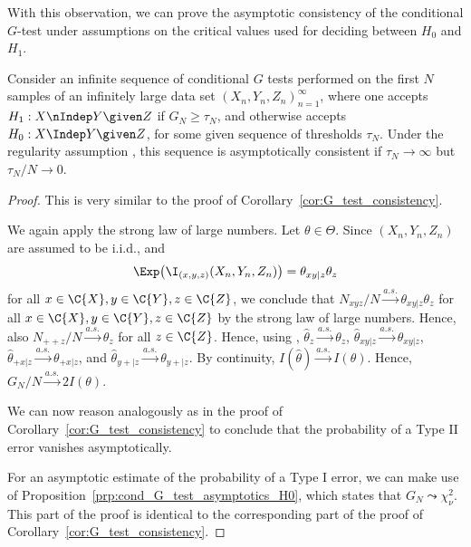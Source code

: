 With this observation, we can prove the asymptotic consistency of the conditional $G$-test under assumptions on the critical values used
for deciding between $H_0$ and $H_1$.
\begin{Cor}\label{cor:cond_G_test_consistency}
Consider an infinite sequence of conditional $G$ tests performed on the first $N$ samples of an infinitely large
data set $(X_n,Y_n,Z_n)_{n=1}^\infty$,
where one accepts $H_1 : X \nIndep Y \given Z$ if $G_N \ge \tau_N$, and otherwise accepts $H_0 : X \Indep Y \given Z$, 
for some given sequence of thresholds $\tau_N$.
Under the regularity assumption , this sequence is
asymptotically consistent if $\tau_N \to \infty$ but $\tau_N / N \to 0$.
\end{Cor}
\begin{proof}
This is very similar to the proof of Corollary~\ref{cor:G_test_consistency}.
  
We again apply the strong law of large numbers.
Let $\theta \in \Theta$. Since $(X_n,Y_n,Z_n)$ are assumed to be i.i.d., and 
  $$\Exp \big(\I_{(x,y,z)}(X_n,Y_n,Z_n)\big) = \theta_{xy|z}\theta_z$$
for all $x \in \C{X}, y \in \C{Y}, z \in \C{Z}$,
we conclude that $N_{xyz} / N \stackrel{a.s.}{\to} \theta_{xy|z} \theta_z$ for all $x \in \C{X}, y \in \C{Y}, z\in \C{Z}$
by the strong law of large numbers. Hence, also $N_{+ + z} / N \stackrel{a.s.}{\to} \theta_z$ for all $z \in \C{Z}$.
Hence, using ,
$\hat\theta_z \stackrel{a.s.}{\to} \theta_z$,
$\hat\theta_{xy|z} \stackrel{a.s.}{\to} \theta_{xy|z}$,
$\hat\theta_{+ x|z} \stackrel{a.s.}{\to} \theta_{+ x|z}$, and
$\hat\theta_{y +|z} \stackrel{a.s.}{\to} \theta_{y +|z}$.
By continuity, $I(\hat\theta) \stackrel{a.s.}{\to} I(\theta)$.
Hence, $G_N / N \stackrel{a.s.}{\to} 2I(\theta)$. 
  
We can now reason analogously as in the proof of 
Corollary~\ref{cor:G_test_consistency} to conclude that
the probability of a Type II error vanishes asymptotically.

For an asymptotic estimate of the probability of a Type I error,
we can make use of Proposition~\ref{prp:cond_G_test_asymptotics_H0},
which states that $G_N \leadsto \chi_{\nu}^2$. 
This part of the proof is identical to the corresponding part of the proof of Corollary~\ref{cor:G_test_consistency}.
\end{proof}
